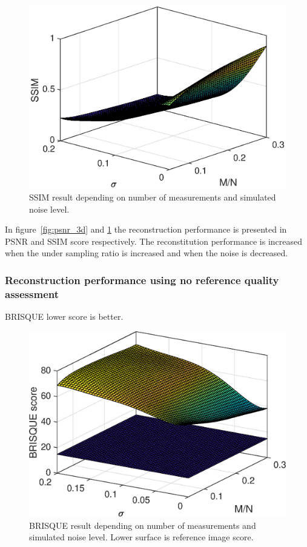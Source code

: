 \begin{figure}[H]
    \centering
    \includegraphics[width = 0.7\linewidth]{result/synt_sss/SSIM_fit.eps}
    \caption{SSIM result depending on number of measurements and simulated noise level.}
    \label{fig:ssim_3d}
\end{figure}

In figure~\ref{fig:psnr_3d} and \ref{fig:ssim_3d} the reconstruction performance is presented in PSNR and SSIM score respectively. The reconstitution performance is increased when the under sampling ratio is increased and when the noise is decreased.  

\subsubsection{Reconstruction performance using no reference quality assessment}
BRISQUE lower score is better.

\begin{figure}[H]
    \centering
    \includegraphics[width = 0.7\linewidth]{result/synt_brisque/BRISQUE_fit.eps}
    \caption{BRISQUE result depending on number of measurements and simulated noise level. Lower surface is reference image score.}
    \label{fig:Brisque_3d}
\end{figure}

